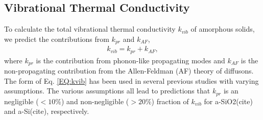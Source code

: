 \documentclass[aps,prb,twocolumn,superscriptaddress,footinbib,amsmath,amssymb,floatfix]{revtex4}
\begin{document}
\subsection{\label{S:Theory:Thermal}Vibrational Thermal Conductivity}

To calculate the total vibrational thermal conductivity $k_{vib}$ 
of amorphous solids, we predict 
the contributions from $k_{pr}$ and $k_{AF}$, 
\begin{equation}\label{EQ:kvib}
\begin{split}
k_{vib} = k_{pr} + k_{AF},
\end{split}
\end{equation}
where $k_{pr}$\cite{ashcroft_solid_1976,dove_introduction_1993,
ziman_electrons_2001} is the contribution from phonon-like 
propagating modes and $k_{AF}$ is the non-propagating contribution 
from the Allen-Feldman (AF) theory of diffusons.
\cite{feldman_thermal_1993} The form of Eq. \eqref{EQ:kvib}
has been used in 
several previous studies with varying assumptions. The various 
assumptions all lead to predictions that $k_{pr}$ is an negligible 
($< 10\%$) 
and non-negligible ($> 20\%$) fraction of $k_{vib}$ 
for a-SiO2(cite) and a-Si(cite), respectively.  
\end{document}
